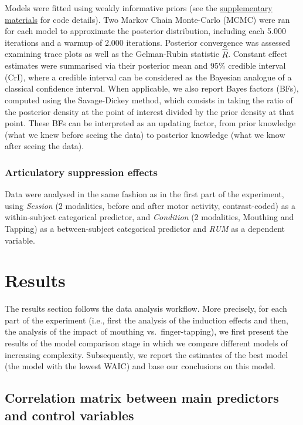 \documentclass[a4paper,12pt,twoside,openright,oldfontcommands]{memoir}
\begin{document}
Models were fitted using weakly informative priors (see the \protect\hyperlink{suppCh6}{supplementary materials} for code details). Two Markov Chain Monte-Carlo (MCMC) were ran for each model to approximate the posterior distribution, including each 5.000 iterations and a warmup of 2.000 iterations. Posterior convergence was assessed examining trace plots as well as the Gelman-Rubin statistic \(\hat{R}\). Constant effect estimates were summarised via their posterior mean and 95\% credible interval (CrI), where a credible interval can be considered as the Bayesian analogue of a classical confidence interval. When applicable, we also report Bayes factors (BFs), computed using the Savage-Dickey method, which consists in taking the ratio of the posterior density at the point of interest divided by the prior density at that point. These BFs can be interpreted as an updating factor, from prior knowledge (what we knew before seeing the data) to posterior knowledge (what we know after seeing the data).

\hypertarget{articulatory-suppression-effects}{%
\subsubsection{Articulatory suppression effects}\label{articulatory-suppression-effects}}

Data were analysed in the same fashion as in the first part of the experiment, using \emph{Session} (2 modalities, before and after motor activity, contrast-coded) as a within-subject categorical predictor, and \emph{Condition} (2 modalities, Mouthing and Tapping) as a between-subject categorical predictor and \emph{RUM} as a dependent variable.

\hypertarget{results-3}{%
\section{Results}\label{results-3}}

The results section follows the data analysis workflow. More precisely, for each part of the experiment (i.e., first the analysis of the induction effects and then, the analysis of the impact of mouthing vs.~finger-tapping), we first present the results of the model comparison stage in which we compare different models of increasing complexity. Subsequently, we report the estimates of the best model (the model with the lowest WAIC) and base our conclusions on this model.

\hypertarget{correlation-matrix-between-main-predictors-and-control-variables}{%
\subsection{Correlation matrix between main predictors and control variables}\label{correlation-matrix-between-main-predictors-and-control-variables}}
\end{document}
